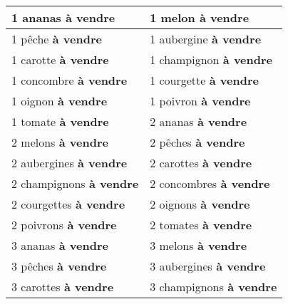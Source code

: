 \documentclass{article}
\date{}
\newcommand{\tabrowEnd}{\rule{0pt}{35pt}\\}
\begin{document}
  \centering
  \noindent
  {\LARGE
    \begin{tabular}{| p{} | p{} |}
      \hline
      1 ananas \textbf{à vendre}      & 1 melon \textbf{à vendre} \tabrowEnd
      \hline
      1 pêche \textbf{à vendre}       & 1 aubergine \textbf{à vendre} \tabrowEnd
      \hline
      1 carotte \textbf{à vendre}     & 1 champignon \textbf{à vendre} \tabrowEnd
      \hline
      1 concombre \textbf{à vendre}   & 1 courgette \textbf{à vendre} \tabrowEnd
      \hline
      1 oignon \textbf{à vendre}      & 1 poivron \textbf{à vendre} \tabrowEnd
      \hline
      1 tomate \textbf{à vendre}      & 2 ananas \textbf{à vendre} \tabrowEnd
      \hline
      2 melons \textbf{à vendre}      & 2 pêches \textbf{à vendre} \tabrowEnd
      \hline
      2 aubergines \textbf{à vendre}  & 2 carottes \textbf{à vendre} \tabrowEnd
      \hline
      2 champignons \textbf{à vendre} & 2 concombres \textbf{à vendre} \tabrowEnd
      \hline
      2 courgettes \textbf{à vendre}  & 2 oignons \textbf{à vendre} \tabrowEnd
      \hline
      2 poivrons \textbf{à vendre}    & 2 tomates \textbf{à vendre} \tabrowEnd
      \hline
      3 ananas \textbf{à vendre}      & 3 melons \textbf{à vendre} \tabrowEnd
      \hline
      3 pêches \textbf{à vendre}      & 3 aubergines \textbf{à vendre} \tabrowEnd
      \hline
      3 carottes \textbf{à vendre}    & 3 champignons \textbf{à vendre} \tabrowEnd
      \hline
    \end{tabular}
  }
\end{document}
